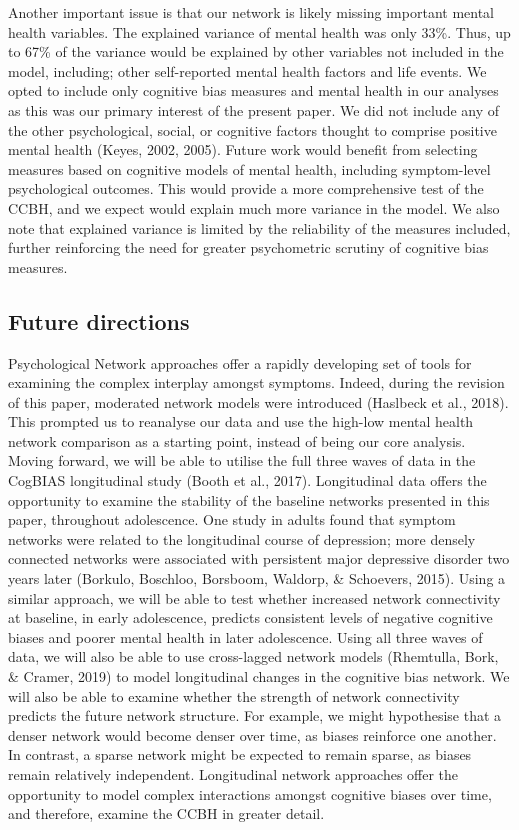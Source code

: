\documentclass[man,floatsintext]{apa6}
\begin{document}
Another important issue is that our network is likely missing important mental health variables. The explained variance of mental health was only 33\%. Thus, up to 67\% of the variance would be explained by other variables not included in the model, including; other self-reported mental health factors and life events. We opted to include only cognitive bias measures and mental health in our analyses as this was our primary interest of the present paper. We did not include any of the other psychological, social, or cognitive factors thought to comprise positive mental health (Keyes, 2002, 2005). Future work would benefit from selecting measures based on cognitive models of mental health, including symptom-level psychological outcomes. This would provide a more comprehensive test of the CCBH, and we expect would explain much more variance in the model. We also note that explained variance is limited by the reliability of the measures included, further reinforcing the need for greater psychometric scrutiny of cognitive bias measures.

\hypertarget{future-directions}{%
\subsection{Future directions}\label{future-directions}}

Psychological Network approaches offer a rapidly developing set of tools for examining the complex interplay amongst symptoms. Indeed, during the revision of this paper, moderated network models were introduced (Haslbeck et al., 2018). This prompted us to reanalyse our data and use the high-low mental health network comparison as a starting point, instead of being our core analysis. Moving forward, we will be able to utilise the full three waves of data in the CogBIAS longitudinal study (Booth et al., 2017). Longitudinal data offers the opportunity to examine the stability of the baseline networks presented in this paper, throughout adolescence. One study in adults found that symptom networks were related to the longitudinal course of depression; more densely connected networks were associated with persistent major depressive disorder two years later (Borkulo, Boschloo, Borsboom, Waldorp, \& Schoevers, 2015). Using a similar approach, we will be able to test whether increased network connectivity at baseline, in early adolescence, predicts consistent levels of negative cognitive biases and poorer mental health in later adolescence. Using all three waves of data, we will also be able to use cross-lagged network models (Rhemtulla, Bork, \& Cramer, 2019) to model longitudinal changes in the cognitive bias network. We will also be able to examine whether the strength of network connectivity predicts the future network structure. For example, we might hypothesise that a denser network would become denser over time, as biases reinforce one another. In contrast, a sparse network might be expected to remain sparse, as biases remain relatively independent. Longitudinal network approaches offer the opportunity to model complex interactions amongst cognitive biases over time, and therefore, examine the CCBH in greater detail.
\end{document}
